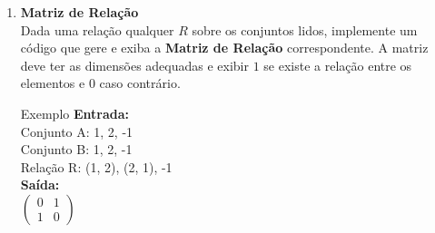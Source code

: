 \documentclass[12pt]{article}
\begin{document}
\begin{enumerate}
\begin{block}{Exemplo}
\textbf{Entrada:} \\
Conjunto A: 1, 2, -1 \\
Relação R: (1, 1), (2, 2), (1, 2), -1 (fim da relação) \\
\textbf{Saída:} \\
Reflexiva: Sim \\
Simétrica: Não (falta (2, 1)) \\
Antissimétrica: Sim \\
Assimétrica: Não (contém (1, 1))
\end{block}

\vspace{0.3cm}
\item \textbf{Matriz de Relação}\\
Dada uma relação qualquer $R$ sobre os conjuntos lidos, implemente um código que gere e exiba a \textbf{Matriz de Relação} correspondente. A matriz deve ter as dimensões adequadas e exibir $1$ se existe a relação entre os elementos e $0$ caso contrário.

\begin{block}{Exemplo}
\textbf{Entrada:} \\
Conjunto A: 1, 2, -1 \\
Conjunto B: 1, 2, -1 \\
Relação R: (1, 2), (2, 1), -1 \\
\textbf{Saída:} \\
$\begin{pmatrix} 0 & 1 \\ 1 & 0 \end{pmatrix}$
\end{block}

\end{enumerate}
\end{document}
